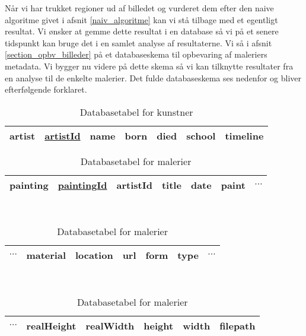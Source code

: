 {
Når vi har trukket regioner ud af billedet og vurderet dem efter den
naive algoritme givet i afsnit \ref{naiv_algoritme} kan vi stå tilbage
med et egentligt resultat. Vi ønsker at gemme dette resultat i en
database så vi på et senere tidspunkt kan bruge det i en samlet analyse
af resultaterne.  Vi så i afsnit \ref{section_opbv_billeder} på et
databaseskema til opbevaring af maleriers metadata. Vi bygger nu videre
på dette skema så vi kan tilknytte resultater fra en analyse til de
enkelte malerier. Det fulde databaseskema ses nedenfor og bliver
efterfølgende forklaret.

\begin{table}[!h]
    \centering
    \begin{tabular}{|l||c|c|c|c|c|c|}
        \hline
        \bf{artist} \hspace{0.5cm} & \underline{artistId} & name & born & died & school & timeline \\\hline
    \end{tabular}
    \caption{Databasetabel for kunstner}
    \label{artistTable}
\end{table}

\begin{table}[!h]
    \centering
    \begin{tabular}{|l||c|c|c|c|c|c}
        \hline
        \bf{painting} \hspace{0.5cm} & \underline{paintingId} & artistId & title & date & paint & $\cdots$ \\\hline
    \end{tabular}\\ \vspace{0.2cm}\hspace{1.2cm}
    \begin{tabular}{c|c|c|c|c|c|c}
        \hline
        $\cdots$ & material & location & url & form & type & $\cdots$ \\\hline
    \end{tabular}\\ \vspace{0.2cm}\hspace{1.4cm}
    \begin{tabular}{c|c|c|c|c|c|}
        \hline
        $\cdots$ & realHeight & realWidth & height & width & filepath \\\hline
    \end{tabular}
    \caption{Databasetabel for malerier}
    \label{paintingTable}
\end{table}

}
